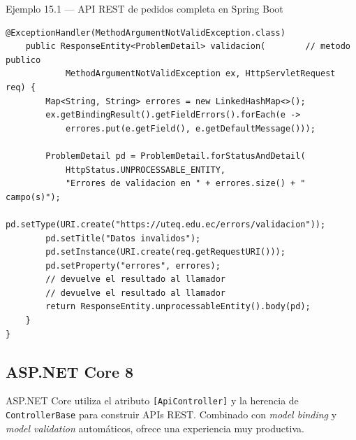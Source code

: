 \documentclass[11pt,a4paper,openany]{book}
\begin{document}
\begin{cajaejemplo}{Ejemplo 15.1 --- API REST de pedidos completa en Spring Boot}
\begin{lstlisting}[style=java,caption={GlobalExceptionHandler.java},label=lst:15.3]
    @ExceptionHandler(MethodArgumentNotValidException.class)
    public ResponseEntity<ProblemDetail> validacion(        // metodo publico
            MethodArgumentNotValidException ex, HttpServletRequest req) {
        Map<String, String> errores = new LinkedHashMap<>();
        ex.getBindingResult().getFieldErrors().forEach(e ->
            errores.put(e.getField(), e.getDefaultMessage()));

        ProblemDetail pd = ProblemDetail.forStatusAndDetail(
            HttpStatus.UNPROCESSABLE_ENTITY,
            "Errores de validacion en " + errores.size() + " campo(s)");
        pd.setType(URI.create("https://uteq.edu.ec/errors/validacion"));
        pd.setTitle("Datos invalidos");
        pd.setInstance(URI.create(req.getRequestURI()));
        pd.setProperty("errores", errores);
        // devuelve el resultado al llamador
        // devuelve el resultado al llamador
        return ResponseEntity.unprocessableEntity().body(pd);
    }
}
\end{lstlisting}
\end{cajaejemplo}

\subsection{ASP.NET Core 8}

ASP.NET Core utiliza el atributo \texttt{[ApiController]} y
la herencia de \texttt{ControllerBase} para construir APIs REST.
Combinado con \emph{model binding} y \emph{model validation}
automáticos, ofrece una experiencia muy productiva.
\end{document}
